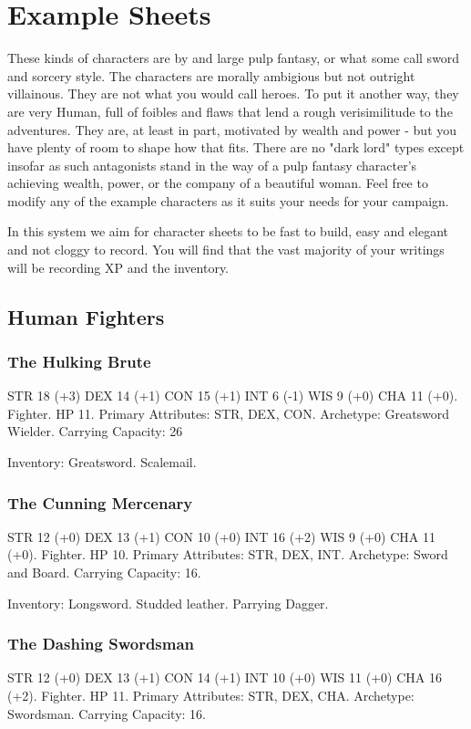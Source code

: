 \chapter{Example Sheets}

These kinds of characters are by and large pulp fantasy, or what some call sword and sorcery style. The characters are morally ambigious but not outright villainous. They are not what you would call heroes. To put it another way, they are very Human, full of foibles and flaws that lend a rough verisimilitude to the adventures. They are, at least in part, motivated by wealth and power - but you have plenty of room to shape how that fits. There are no "dark lord" types except insofar as such antagonists stand in the way of a pulp fantasy character's achieving wealth, power, or the company of a beautiful woman. Feel free to modify any of the example characters as it suits your needs for your campaign. 

\begin{framed}\centering
In this system we aim for character sheets to be fast to build, easy and elegant and not cloggy to record. You will find that the vast majority of your writings will be recording XP and the inventory. 
\end{framed}


    \section{Human Fighters}
        \subsection{The Hulking Brute} STR 18 (+3) DEX 14 (+1) CON 15 (+1) INT 6 (-1) WIS 9 (+0) CHA 11 (+0). Fighter. HP 11. Primary Attributes: STR, DEX, CON. Archetype: Greatsword Wielder. Carrying Capacity: 26
        
        Inventory: Greatsword. Scalemail.
        

        \subsection{The Cunning Mercenary} STR 12 (+0) DEX 13 (+1) CON 10 (+0) INT 16 (+2) WIS 9 (+0) CHA 11 (+0). Fighter. HP 10. Primary Attributes: STR, DEX, INT. Archetype: Sword and Board. Carrying Capacity: 16. 
        
        Inventory: Longsword. Studded leather. Parrying Dagger. 
        
        \subsection{The Dashing Swordsman} STR 12 (+0) DEX 13 (+1) CON 14 (+1) INT 10 (+0) WIS 11 (+0) CHA 16 (+2). Fighter. HP 11. Primary Attributes: STR, DEX, CHA. Archetype: Swordsman. Carrying Capacity: 16. 
        
